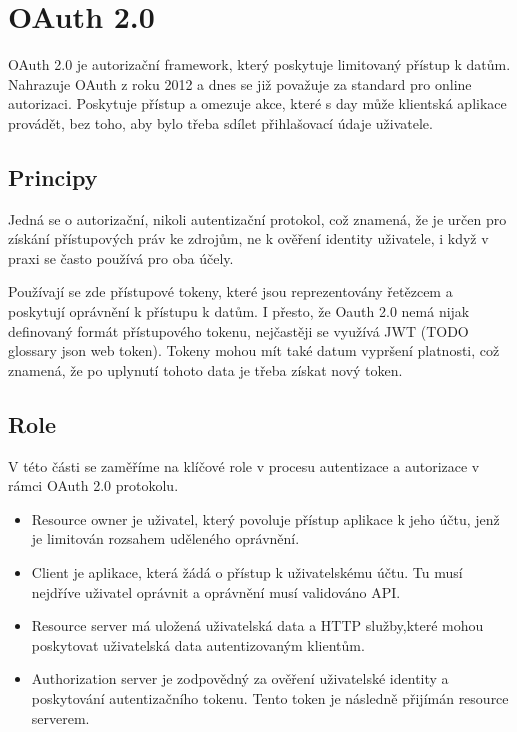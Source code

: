 \section{OAuth 2.0}
OAuth 2.0 je autorizační framework, který poskytuje limitovaný přístup k datům. Nahrazuje OAuth z roku 2012 a dnes se již považuje za standard pro online autorizaci. Poskytuje přístup a omezuje akce, které s day může klientská aplikace provádět, bez toho, aby bylo třeba sdílet přihlašovací údaje uživatele.


\subsection{Principy}
Jedná se o autorizační, nikoli autentizační protokol, což znamená, že je určen pro získání přístupových práv ke zdrojům, ne k ověření identity uživatele, i když v praxi se často používá pro oba účely.

Používají se zde přístupové tokeny, které jsou reprezentovány řetězcem a poskytují oprávnění k přístupu k datům. I přesto, že Oauth 2.0 nemá nijak definovaný formát přístupového tokenu, nejčastěji se využívá JWT (TODO glossary json web token). Tokeny mohou mít také datum vypršení platnosti, což znamená, že po uplynutí tohoto data je třeba získat nový token. 


\subsection{Role}\label{sec:Oauth_roles}
V této části se zaměříme na klíčové role v procesu autentizace a autorizace v rámci OAuth 2.0 protokolu.

\begin{itemize}
    \item Resource owner je uživatel, který povoluje přístup aplikace k jeho účtu, jenž je limitován rozsahem uděleného oprávnění.
    \item Client je aplikace, která žádá o přístup k uživatelskému účtu. Tu musí nejdříve uživatel oprávnit a oprávnění musí validováno API.
    \item Resource server má uložená uživatelská data a HTTP služby,které mohou poskytovat uživatelská data autentizovaným klientům.
    \item Authorization server je zodpovědný za ověření uživatelské identity a poskytování autentizačního tokenu. Tento token je následně přijímán resource serverem.
\end{itemize}



